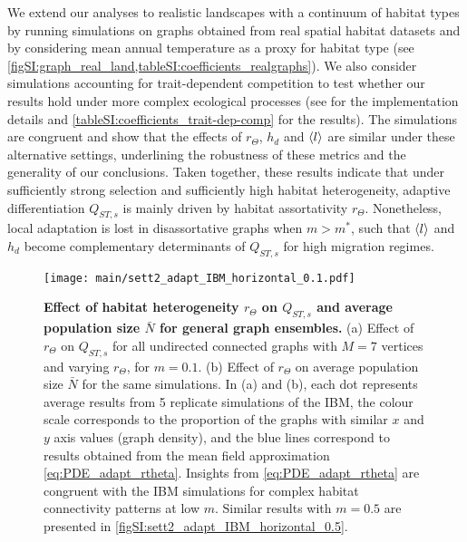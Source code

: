 We extend our analyses to realistic landscapes with a continuum of habitat types by running simulations on graphs obtained from real spatial habitat datasets and by considering mean annual temperature as a proxy for habitat type (see \cref{figSI:graph_real_land,tableSI:coefficients_realgraphs}). 
%
We also consider simulations accounting for trait-dependent competition to test whether our results hold under more complex ecological processes (see  for the implementation details and \cref{tableSI:coefficients_trait-dep-comp} for the results). 
%
The simulations are congruent and show that the effects of $r_\Theta$, $h_d$ and $\langle l \rangle$ are similar under these alternative settings, underlining the robustness of these metrics and the generality of our conclusions.
%
Taken together, these results indicate that under sufficiently strong selection and sufficiently high habitat heterogeneity, adaptive differentiation $Q_{ST,s}$ is mainly driven by habitat assortativity $r_\Theta$. 
%
Nonetheless, local adaptation is lost in disassortative graphs when $m > m^*$, such that $\langle l \rangle$ and $h_d$ become complementary determinants of $Q_{ST,s}$ for high migration regimes.

\begin{figure}[ht]
  \centering
    \texttt{[image: main/sett2\_adapt\_IBM\_horizontal\_0.1.pdf]}
    \caption{{\textbf{Effect of habitat heterogeneity $r_\Theta$ on $Q_{ST,s}$ and average population size $\bar{N}$ for general graph ensembles.} (a) Effect of $r_\Theta$ on $Q_{ST,s}$ for all undirected connected graphs with $M = 7$ vertices and varying $r_\Theta$, for $m = 0.1$. (b) Effect of $r_\Theta$ on average population size $\bar{N}$ for the same simulations. In (a) and (b), each dot represents average results from 5 replicate simulations of the IBM, the colour scale corresponds to the proportion of the graphs with similar $x$ and $y$ axis values (graph density), and the blue lines correspond to results obtained from the mean field approximation \cref{eq:PDE_adapt_rtheta}. Insights from \cref{eq:PDE_adapt_rtheta} are congruent with the IBM simulations for complex habitat connectivity patterns at low $m$. Similar results with $m=0.5$ are presented in \cref{figSI:sett2_adapt_IBM_horizontal_0.5}.}}
    \label{fig:sett2_adapt_IBM_horizontal_0.1}
\end{figure}

